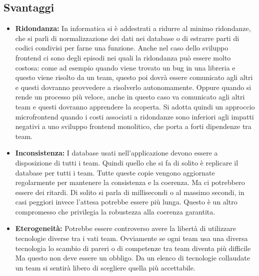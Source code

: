 \subsection*{Svantaggi}
\begin{itemize}

\item \textbf{Ridondanza:}
In informatica si è addestrati a ridurre al minimo ridondanze, che si parli di normalizzazione dei dati nei database o di estrarre parti di codici condivisi per farne una funzione.
Anche nel caso dello sviluppo frontend ci sono degli episodi nei quali la ridondanza può essere molto costosa: come ad esempio quando viene trovato un bug in una libreria e questo viene risolto da un team, questo poi dovrà essere comunicato agli altri e questi dovranno provvedere a risolverlo autonomamente. Oppure quando si rende un processo più veloce, anche in questo caso va comunicato agli altri team e questi dovranno apprendere la scoperta.
Si adotta quindi un approccio microfrontend quando i costi associati a ridondanze sono inferiori agli impatti negativi a uno sviluppo frontend monolitico, che porta a forti dipendenze tra team.




\item \textbf{Inconsistenza:}
I database usati nell’applicazione devono essere a disposizione di tutti i team. Quindi quello che si fa di solito è replicare il database per tutti i team. Tutte queste copie vengono aggiornate regolarmente per mantenere la consistenza e la coerenza. Ma ci potrebbero essere dei ritardi. Di solito si parla di millisecondi o al massimo secondi, in casi peggiori invece l’attesa potrebbe essere più lunga.
Questo è un altro compromesso che privilegia la robustezza alla coerenza garantita.

\item \textbf{Eterogeneità:}
Potrebbe essere controverso avere la libertà di utilizzare tecnologie diverse tra i vati team. Ovviamente se ogni team usa una diversa tecnologia lo scambio di pareri o di competenze tra team diventa più difficile
Ma questo non deve essere un obbligo. Da un elenco di tecnologie collaudate un team si sentirà libero di scegliere quella più accettabile.
\end{itemize}